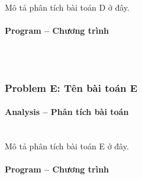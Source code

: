 Mô tả phân tích bài toán D ở đây.

\paragraph{Program -- Chương trình} \mbox{} \\

\begin{lstlisting}

\end{lstlisting}

\subsubsection{Problem E: Tên bài toán E}

\paragraph{Analysis -- Phân tích bài toán} \mbox{} \\

Mô tả phân tích bài toán E ở đây.

\paragraph{Program -- Chương trình} \mbox{} \\

\begin{lstlisting} 

\end{lstlisting}
